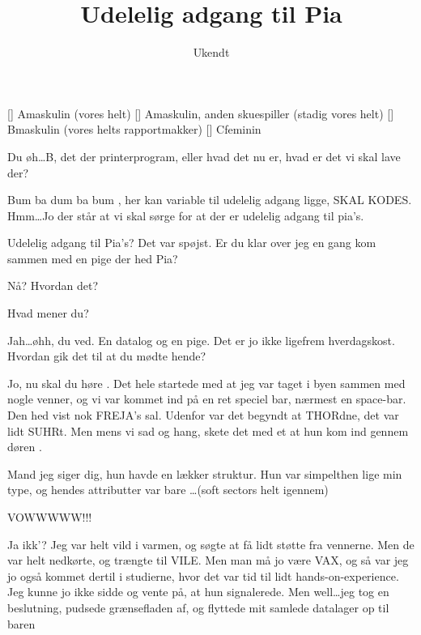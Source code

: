 \documentclass[a4paper,11pt]{article}
\title{Udelelig adgang til Pia}
\author{Ukendt}
\begin{document}
\maketitle

\begin{roles}
    [] Amaskulin (vores helt) 
    [] Amaskulin, anden skuespiller (stadig vores helt) 
    [] Bmaskulin (vores helts rapportmakker)
    [] Cfeminin
\end{roles}

\begin{sketch}

     Du øh\ldots B, det der printerprogram, eller hvad det nu er, hvad er det vi skal lave der?

     Bum ba dum ba bum ,  her kan variable til udelelig adgang ligge, SKAL KODES.
             Hmm\ldots Jo der står at vi skal sørge for at der er udelelig adgang til pia's.

     Udelelig adgang til Pia's? Det var spøjst. Er du klar over jeg en gang kom sammen med en pige der hed Pia?

     Nå? Hvordan det?

     Hvad mener du?

     Jah\ldots øhh, du ved. En datalog og en pige. Det er jo ikke ligefrem hverdagskost. Hvordan gik det til at du mødte hende?

     Jo, nu skal du høre .  Det hele startede med at jeg var taget i byen sammen med nogle venner,
             og vi var kommet ind på en ret speciel bar, nærmest en space-bar. Den hed vist nok FREJA's sal. Udenfor var det begyndt at THORdne,
             det var lidt SUHRt. Men mens vi sad og hang, skete det med et at hun kom ind gennem døren .

             Mand jeg siger dig, hun havde en lækker struktur. Hun var simpelthen lige min type, og hendes attributter var bare \ldots (soft sectors helt igennem)

     VOWWWWW!!!

     Ja ikk'? Jeg var helt vild i varmen, og søgte at få lidt støtte fra vennerne. Men de var helt nedkørte, og trængte til VILE. Men man må jo være VAX,
             og så var jeg jo også kommet dertil i studierne, hvor det var tid til lidt hands-on-experience. Jeg kunne jo ikke sidde og vente på,
             at hun signalerede. Men well\ldots jeg tog en beslutning, pudsede grænsefladen af, og flyttede mit samlede datalager op til baren


\end{sketch}
\end{document}
